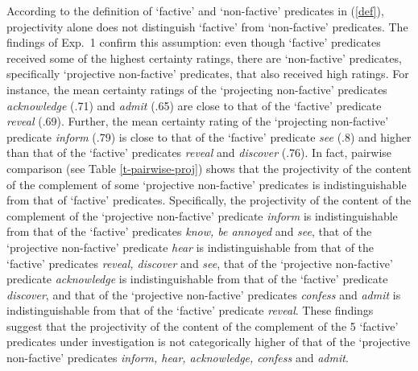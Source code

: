 \documentclass[11pt,fleqn]{article}
\newcommand{\6}{\mbox{$[\hspace*{-.6mm}[$}}
\newcommand{\9}{\mbox{$]\hspace*{-.6mm}]$}}
\begin{document}
According to the definition of `factive' and `non-factive' predicates in (\ref{def}), projectivity alone does not distinguish `factive' from `non-factive' predicates. The findings of Exp.~1 confirm this assumption: even though `factive' predicates received some of the highest certainty ratings, there are `non-factive' predicates, specifically `projective non-factive' predicates, that also received high ratings. For instance, the mean certainty ratings of the `projecting non-factive' predicates {\em acknowledge} (.71) and {\em admit} (.65) are close to that of the `factive' predicate {\em reveal} (.69). Further, the mean certainty rating of the `projecting non-factive' predicate {\em inform} (.79) is close to that of the `factive' predicate {\em see} (.8) and higher than that of the `factive' predicates {\em reveal} and  {\em discover} (.76).  In fact, pairwise comparison (see Table \ref{t-pairwise-proj}) shows that the projectivity of the content of the complement of some `projective non-factive' predicates is indistinguishable from that of `factive' predicates. Specifically, the projectivity of the content of the complement of the `projective non-factive' predicate {\em inform} is indistinguishable from that of the `factive' predicates {\em know, be annoyed} and {\em see}, that of the `projective non-factive' predicate {\em hear} is indistinguishable from that of the `factive' predicates {\em reveal, discover} and {\em see}, that of the `projective non-factive' predicate {\em acknowledge} is indistinguishable from that of the `factive' predicate {\em discover}, and that of the `projective non-factive' predicates {\em confess} and {\em admit} is indistinguishable from that of the `factive' predicate {\em reveal}. These findings suggest that the projectivity of the content of the complement of the 5 `factive' predicates under investigation is not categorically higher of that of the `projective non-factive' predicates {\em inform, hear, acknowledge, confess} and {\em admit}. 

\end{document}
